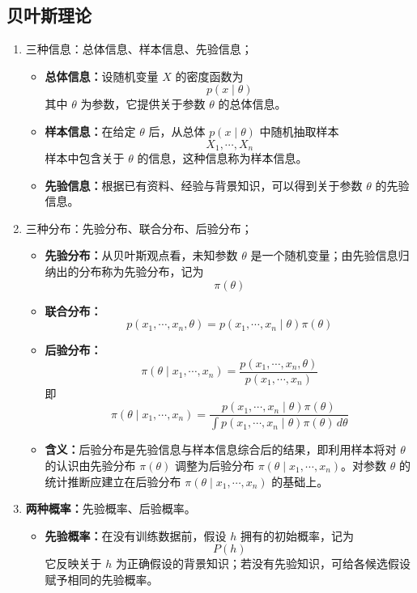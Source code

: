 \documentclass[../main.tex]{subfiles}
\begin{document}
\subsection{贝叶斯理论}\label{sec:bayes-theory}
\begin{enumerate}
    \item 三种信息：总体信息、样本信息、先验信息；
    \begin{itemize}
        \item \textbf{总体信息：}设随机变量 $X$ 的密度函数为
        $$
        p(x\mid \theta)
        $$
        其中 $\theta$ 为参数，它提供关于参数 $\theta$ 的总体信息。
    
        \item \textbf{样本信息：}在给定 $\theta$ 后，从总体 $p(x\mid \theta)$ 中随机抽取样本
        $$
        X_1,\cdots,X_n
        $$
        样本中包含关于 $\theta$ 的信息，这种信息称为样本信息。
    
        \item \textbf{先验信息：}根据已有资料、经验与背景知识，可以得到关于参数 $\theta$ 的先验信息。
    \end{itemize}
    \item 三种分布：先验分布、联合分布、后验分布；
    \begin{itemize}
        \item \textbf{先验分布：}从贝叶斯观点看，未知参数 $\theta$ 是一个随机变量；由先验信息归纳出的分布称为先验分布，记为
        $$
        \pi(\theta)
        $$
    
        \item \textbf{联合分布：}
        $$
        p(x_1,\cdots,x_n,\theta)=p(x_1,\cdots,x_n\mid \theta)\pi(\theta)
        $$
    
        \item \textbf{后验分布：}
        $$
        \pi(\theta\mid x_1,\cdots,x_n)
        =\frac{p(x_1,\cdots,x_n,\theta)}{p(x_1,\cdots,x_n)}
        $$
        即
        $$
        \pi(\theta\mid x_1,\cdots,x_n)
        =\frac{p(x_1,\cdots,x_n\mid \theta)\pi(\theta)}
        {\int p(x_1,\cdots,x_n\mid \theta)\pi(\theta)\,d\theta}
        $$
    
        \item \textbf{含义：}后验分布是先验信息与样本信息综合后的结果，即利用样本将对 $\theta$ 的认识由先验分布 $\pi(\theta)$ 调整为后验分布 $\pi(\theta\mid x_1,\cdots,x_n)$。对参数 $\theta$ 的统计推断应建立在后验分布
        $
        \pi(\theta\mid x_1,\cdots,x_n)
        $
        的基础上。
    \end{itemize}
    \item \textbf{两种概率：}先验概率、后验概率。
    \begin{itemize}
        \item \textbf{先验概率：}在没有训练数据前，假设 $h$ 拥有的初始概率，记为
        $$
        P(h)
        $$
        它反映关于 $h$ 为正确假设的背景知识；若没有先验知识，可给各候选假设赋予相同的先验概率。


\end{itemize}
\end{enumerate}
\end{document}
